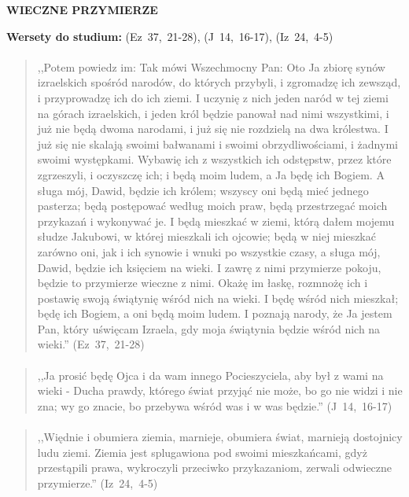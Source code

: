 \documentclass[10pt,a4paper,oneside]{article}
\begin{document}
\centerline{\textbf{\MakeUppercase{Wieczne przymierze}}}
\begin{center}
\textbf{Wersety do studium:} 
\mbox{(Ez 37, 21-28)}, \mbox{(J 14, 16-17)}, \mbox{(Iz 24, 4-5)}
\end{center}
\paragraph{}
\begin{quote}
,,Potem powiedz im: Tak mówi Wszechmocny Pan: Oto Ja zbiorę synów izraelskich spośród narodów, do których przybyli, i zgromadzę ich zewsząd, i przyprowadzę ich do ich ziemi. I uczynię z nich jeden naród w tej ziemi na górach izraelskich, i jeden król będzie panował nad nimi wszystkimi, i już nie będą dwoma narodami, i już się nie rozdzielą na dwa królestwa. I już się nie skalają swoimi bałwanami i swoimi obrzydliwościami, i żadnymi swoimi występkami. Wybawię ich z wszystkich ich odstępstw, przez które zgrzeszyli, i oczyszczę ich; i będą moim ludem, a Ja będę ich Bogiem. A sługa mój, Dawid, będzie ich królem; wszyscy oni będą mieć jednego pasterza; będą postępować według moich praw, będą przestrzegać moich przykazań i wykonywać je. I będą mieszkać w ziemi, którą dałem mojemu słudze Jakubowi, w której mieszkali ich ojcowie; będą w niej mieszkać zarówno oni, jak i ich synowie i wnuki po wszystkie czasy, a sługa mój, Dawid, będzie ich księciem na wieki. I zawrę z nimi przymierze pokoju, będzie to przymierze wieczne z nimi. Okażę im łaskę, rozmnożę ich i postawię swoją świątynię wśród nich na wieki. I będę wśród nich mieszkał; będę ich Bogiem, a oni będą moim ludem. I poznają narody, że Ja jestem Pan, który uświęcam Izraela, gdy moja świątynia będzie wśród nich na wieki.'' \mbox{(Ez 37, 21-28)}
\end{quote}
\paragraph{}
\begin{quote}
,,Ja prosić będę Ojca i da wam innego Pocieszyciela, aby był z wami na wieki - Ducha prawdy, którego świat przyjąć nie może, bo go nie widzi i nie zna; wy go znacie, bo przebywa wśród was i w was będzie.'' \mbox{(J 14, 16-17)}
\end{quote}
\paragraph{}
\begin{quote}
,,Więdnie i obumiera ziemia, marnieje, obumiera świat, marnieją dostojnicy ludu ziemi. Ziemia jest splugawiona pod swoimi mieszkańcami, gdyż przestąpili prawa, wykroczyli przeciwko przykazaniom, zerwali odwieczne przymierze.'' \mbox{(Iz 24, 4-5)}
\end{quote}
\end{document}
